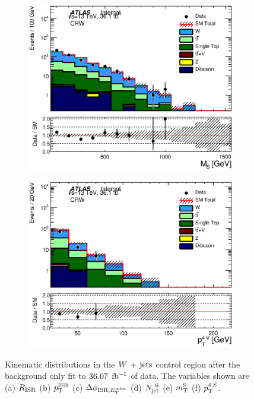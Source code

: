 \begin{figure}[h!]
\begin{center}
\begin{subfigure}[b]{0.40\textwidth}
    	 \includegraphics[width=\textwidth]{figures/plotRegion/CA_MS_CRW_log.eps}
                \caption{ }
    \end{subfigure}
    \begin{subfigure}[b]{0.40\textwidth}    
    	 \includegraphics[width=\textwidth]{figures/plotRegion/CA_pTjV4_CRW_log.eps}
               \caption{ }
    \end{subfigure}
     \caption[~Kinematic distributions in the $\Wjets$ control region after the background only fit to $\intlumi$ $\ifb$ of data]{ Kinematic distributions in the $\Wjets$ control region after the background only fit to $\intlumi$ $\ifb$ of data. The variables shown are (a) $R_{\mathrm{ISR}}$ (b) $p_{\mathrm{T}}^{\mathrm{ISR}}$ (c) $\Delta\phi_{\mathrm{ISR},E_{\mathrm{T}}^{\mathrm{miss}}}$ (d) $N_{\mathrm{jet}}^{~\mathrm{S}}$ (e) $m_{\mathrm{T}}^{\mathrm{S}}$ (f) $p_{\mathrm{T}}^{4,\mathrm{S}}$. }%
  \label{fig:CRW1}
    \end{center}
\end{figure}

